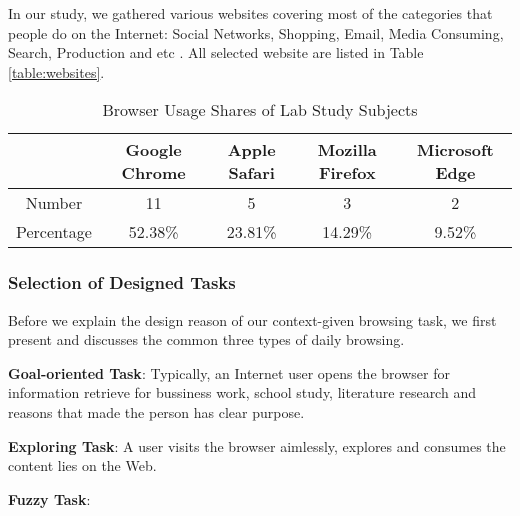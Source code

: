 In our study, we gathered various websites covering most of the categories that people do
on the Internet: Social Networks, Shopping, Email, Media Consuming, Search, Production 
and etc \cite{lori2018internet, lori2017internet}. All selected website are listed 
in Table \ref{table:websites}.

\begin{table}[H]
    \small
    \centering
    \setlength{\belowcaptionskip}{10pt}
    \caption{Browser Usage Shares of Lab Study Subjects}
    \begin{tabular}{ccccc}
          \toprule
        & \textbf{Google Chrome} & \textbf{Apple Safari} & \textbf{Mozilla Firefox} & \textbf{Microsoft Edge} \\
          \hline
          Number     & 11 & 5 & 3 & 2 \\
          Percentage & 52.38\% & 23.81\% & 14.29\% & 9.52\% \\
          \bottomrule
    \end{tabular}
    \label{table:sharesubjects}
\end{table}

\subsubsection{Selection of Designed Tasks}
\label{sec:select-tasks}

Before we explain the design reason of our context-given browsing task, we first present
and discusses the common three types of daily browsing.

\textbf{Goal-oriented Task}: Typically, an Internet user opens the browser for information retrieve
for bussiness work, school study, literature research and reasons that made the person has
clear purpose.

\textbf{Exploring Task}: A user visits the browser aimlessly, explores and consumes the content
lies on the Web.

\textbf{Fuzzy Task}: 

\cleardoublepage